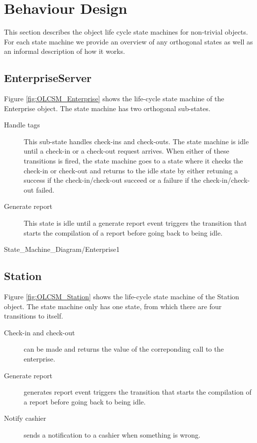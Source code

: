 \section{Behaviour Design}
This section describes the object life cycle state machines for non-trivial objects. For each state machine we provide an overview of any orthogonal states as well as an informal description of how it works.

\subsection{EnterpriseServer}
\madeby{\mb}{\af}
Figure \ref{fig:OLCSM_Enterprise} shows the life-cycle state machine of the Enterprise object. The state machine has two orthogonal sub-states.

\begin{description}
	
	\item[Handle tags] This sub-state handles check-ins and check-outs. The state machine is idle until a check-in or a check-out request arrives. When either of these transitions is fired, the state machine goes to a state where it checks the check-in or check-out and returns to the idle state by either retuning a success if the check-in/check-out succeed or a failure if the check-in/check-out failed.
	\item[Generate report] This state is idle until a generate report event triggers the transition that starts the compilation of a report before going back to being idle.
	
\end{description}

\begin{myfigure}{State_Machine_Diagram/Enterprise}{1}
\caption{Object Life Cycle State Machine Enterprise. \madeby{\af}{\mb}}
\label{fig:OLCSM_Enterprise}
\end{myfigure}

\subsection{Station}
\madeby{\jb}{\mt}
Figure \ref{fig:OLCSM_Station} shows the life-cycle state machine of the Station object. The state machine only has one state, from which there are four transitions to itself.

\begin{description}
	\item[Check-in and check-out] can be made and returns the value of the correponding call to the enterprise.
	\item[Generate report] generates report event triggers the transition that starts the compilation of a report before going back to being idle.
	\item[Notify cashier] sends a notification to a cashier when something is wrong.
\end{description}


